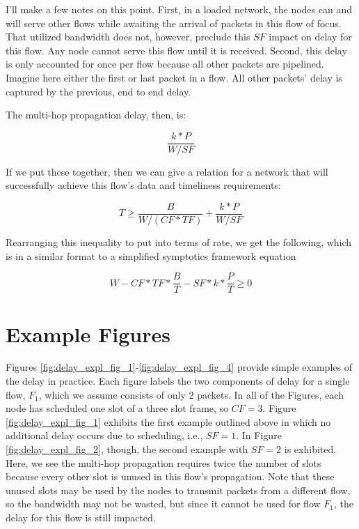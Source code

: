 \documentclass[conference]{IEEEtran}
\begin{document}
I'll make a few notes on this point.  First, in a loaded network, the nodes can and will serve other flows while awaiting the arrival of packets in this flow of focus.  That utilized bandwidth does not, however, preclude this $SF$ impact on delay for this flow.  Any node cannot serve this flow until it is received.  Second, this delay is only accounted for once per flow because all other packets are pipelined.  Imagine here either the first or last packet in a flow.  All other packets' delay is captured by the previous, end to end delay.

The multi-hop propagation delay, then, is:

\begin{equation}
	\frac{k*P}{W/SF}
\end{equation}

If we put these together, then we can give a relation for a network that will successfully achieve this flow's data and timeliness requirements:

\begin{equation}
	T \geq \frac{B}{W/(CF*TF)} + \frac{k*P}{W/SF}
\end{equation}

Rearranging this inequality to put into terms of rate, we get the following, which is in a similar format to a simplified symptotics framework equation

\begin{equation}
	W - CF*TF*\frac{B}{T} - SF*k*\frac{P}{T} \geq 0
\end{equation}

\section{Example Figures}

Figures \ref{fig:delay_expl_fig_1}-\ref{fig:delay_expl_fig_4} provide simple examples of the delay in practice.  Each figure labels the two components of delay for a single flow, $F_1$, which we assume consists of only $2$ packets.  In all of the Figures, each node has scheduled one slot of a three slot frame, so $CF = 3$.  Figure \ref{fig:delay_expl_fig_1} exhibits the first example outlined above in which no additional delay occurs due to scheduling, i.e., $SF = 1$.  In Figure \ref{fig:delay_expl_fig_2}, though, the second example with $SF = 2$ is exhibited.  Here, we see the multi-hop propagation requires twice the number of slots because every other slot is unused in this flow's propagation.  Note that these unused slots may be used by the nodes to transmit packets from a different flow, so the bandwidth may not be wasted, but since it cannot be used for flow $F_1$, the delay for this flow is still impacted.
\end{document}
